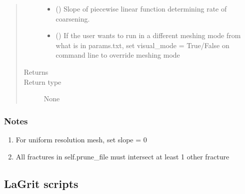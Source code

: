 \documentclass[letterpaper,10pt,english]{sphinxmanual}
\begin{document}
\begin{fulllineitems}
\begin{quote}
\begin{description}
\begin{itemize}
\item {} 
 () \textendash{} Slope of piecewise linear function determining rate of coarsening.

\item {} 
 () \textendash{} If the user wants to run in a different meshing mode from what is in params.txt, set visual\_mode = True/False on command line to override meshing mode

\end{itemize}

\item[{Returns}] \leavevmode


\item[{Return type}] \leavevmode
None

\end{description}\end{quote}
\subsubsection*{Notes}
\begin{enumerate}
\def\theenumi{\arabic{enumi}}
\def\labelenumi{\theenumi .}
\makeatletter\def\p@enumii{\p@enumi \theenumi .}\makeatother
\item {} 
For uniform resolution mesh, set slope = 0

\item {} 
All fractures in self.prune\_file must intersect at least 1 other fracture

\end{enumerate}

\end{fulllineitems}



\subsection{LaGrit scripts}
\label{\detokenize{pydfnworks:module-pydfnworks.dfnGen.lagrit_scripts}}\label{\detokenize{pydfnworks:lagrit-scripts}}\label{\detokenize{pydfnworks:module-lagrit_scripts.py}}
\end{document}
